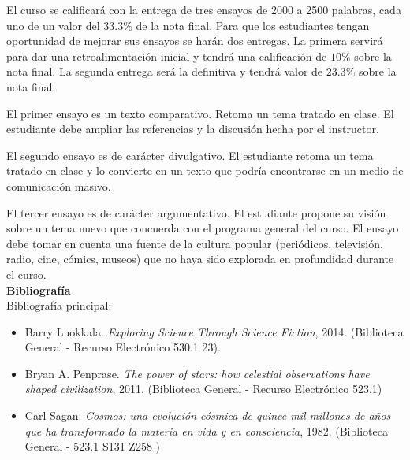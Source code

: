 \documentclass[letterpaper,10pt,onecolumn]{article}
\begin{document}

\noindent\normalsize 
El curso se calificar\'a con la entrega de tres ensayos de 2000 a 2500
palabras, cada uno de un valor del $33.3\%$ de la nota final.  Para
que los estudiantes tengan oportunidad de mejorar sus ensayos se
har\'an dos entregas. La primera servir\'a para dar una
retroalimentaci\'on inicial y tendr\'a una calificaci\'on de $10\%$
sobre la nota final. La segunda entrega ser\'a la definitiva y
tendr\'a  valor de $23.3\%$ sobre la nota final.  
 
El primer ensayo es un texto comparativo. Retoma un tema 
tratado en clase. El estudiante debe ampliar las referencias y la
discusi\'on hecha por el instructor.

El segundo ensayo es de car\'acter divulgativo. El estudiante retoma
un tema tratado en clase y lo convierte en un texto que podr\'ia
encontrarse en un medio de comunicaci\'on masivo.   

El tercer ensayo es de car\'acter argumentativo. El estudiante propone
su visi\'on sobre un tema nuevo que concuerda con el programa general
del curso. El ensayo debe tomar en cuenta una fuente de la cultura
popular (peri\'odicos, televisi\'on, radio, cine, c\'omics, museos) que
no haya sido explorada en profundidad durante el curso.   
\\[0.1cm]

\noindent\textbf{\large {} \quad Bibliograf\'ia}\\[-0.2cm]



\noindent\normalsize Bibliograf\'ia principal:

\begin{itemize}
\item Barry Luokkala. \textit{Exploring Science Through Science
  Fiction}, 2014. (Biblioteca General - Recurso Electr\'onico 530.1 23).\\[-0.6cm]
\item Bryan A. Penprase. \textit{The power of stars: how celestial
  observations have shaped civilization}, 2011. (Biblioteca General -
  Recurso Electr\'onico 523.1) \\[-0.6cm]
\item Carl Sagan. \textit{Cosmos: una evoluci\'on c\'osmica de quince mil
  millones de a\~nos que ha transformado la materia en vida y en
  consciencia}, 1982. (Biblioteca General - 
  523.1 S131 Z258 )\\[-0.6cm]
\end{itemize}
\end{document}
